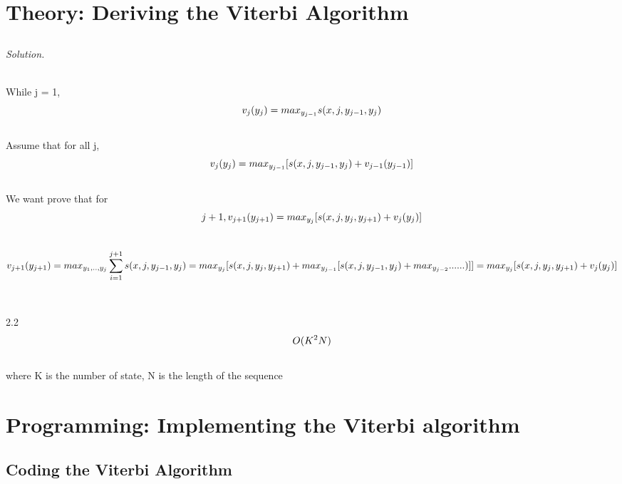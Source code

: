 \documentclass[12pt]{article}
\newcommand\sol[1]{\begin{mdframed}
\emph{Solution.} #1
\end{mdframed}}
\begin{document}
\section{Theory: Deriving the Viterbi Algorithm}

\subsection{}

\sol{

\\While j = 1, 
\begin{equation*}
\\v_j(y_j) = max_{{y_{j-1}}} s(x,j,y_{j-1},y_j)
\end{equation*}
    \\Assume that for all j, 
\begin{equation*}
\\v_j(y_j) = max_{{y_{j-1}}} [s(x,j,y_{j-1},y_j) + v_{j-1}(y_{j-1})]
\end{equation*}
\\We want prove that for 
\begin{equation*}
{j+1}, \\v_{j+1}(y_{j+1}) = max_{{y_{j}}} [s(x,j,y_{j},y_{j+1}) + v_{j}(y_{j})]
\end{equation*}
\\
\begin{equation*}
\\v_{j+1}(y_{j+1}) = max_{{y_1},..,{y_{j}}}\sum_{i=1}^{j+1}s(x,j,y_{j-1},y_j)
= max_{{y_{j}}} [s(x,j,y_{j},y_{j+1}) + max_{{y_{j-1}}} [s(x,j,y_{j-1},y_j) + max_{{y_{j-2}}}......)]] = max_{{y_{j}}} [s(x,j,y_{j},y_{j+1}) + v_{j}(y_{j})]
\end{equation*}
\\
\\2.2
\begin{equation*}
\\O(K^2N) 
\end{equation*}
\\where K is the number of state, N is the length of the sequence
}

\section{Programming: Implementing the Viterbi algorithm }
\subsection{Coding the Viterbi Algorithm}
\end{document}
